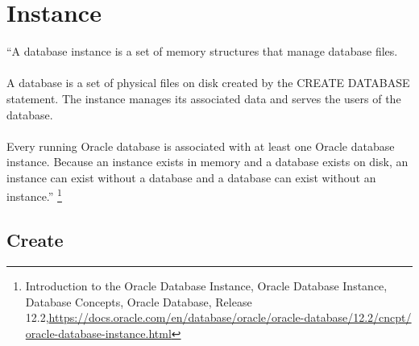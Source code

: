 
\newpage
\setcounter{secnumdepth}{0}

\section{Instance}

``A database instance is a set of memory structures that manage 
database files.\\
\\
A database is a set of physical files on disk created by the 
CREATE DATABASE statement.  The instance manages its associated 
data and serves the users of the database.\\
\\
Every running Oracle database is associated with at least one 
Oracle database instance.  Because an instance exists in memory
and a database exists on disk, an instance can exist without a 
database and a database can exist without an instance.''
\footnote{Introduction to the Oracle Database Instance, Oracle Database Instance, Database Concepts, Oracle Database,
    Release 12.2,\href{https://docs.oracle.com/en/database/oracle/oracle-database/12.2/cncpt/oracle-database-instance.html}{https://docs.oracle.com/en/database/oracle/oracle-database/12.2/cncpt/}\newline
  \href{https://docs.oracle.com/en/database/oracle/oracle-database/12.2/cncpt/oracle-database-instance.html}{oracle-database-instance.html}}


\subsection{Create}

